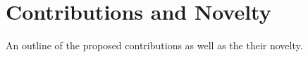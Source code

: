 \chapter{Contributions and Novelty}

An outline of the proposed contributions as well as the their novelty. 